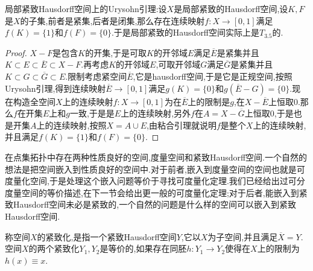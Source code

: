 局部紧致Hausdorff空间上的Urysohn引理:设$X$是局部紧致的Hausdorff空间,设$K,F$是$X$的子集,前者是紧集,后者是闭集,那么存在连续映射$f:X\to[0,1]$满足$f(K)=\{1\}$和$f(F)=\{0\}$.于是局部紧致的Hausdorff空间实际上是$T_{3.5}$的.
\begin{proof}
	
	$X-F$是包含$K$的开集,于是可取$K$的开邻域$E$满足$\overline{E}$是紧集并且$K\subset E\subset\overline{E}\subset X-F$.再考虑$K$的开邻域$E$,可取开邻域$G$满足$\overline{G}$是紧集并且$K\subset G\subset\overline{G}\subset E$.限制考虑紧空间$\overline{E}$,它是hausdorff空间,于是它是正规空间,按照Urysohn引理,得到连续映射$\overline{E}\to[0,1]$满足$g(K)=\{0\}$和$g(\overline{E}-G)=\{0\}$.现在构造全空间$X$上的连续映射$f:X\to[0,1]$为在$\overline{E}$上的限制是$g$,在$X-\overline{E}$上恒取0.那么$f$在开集$E$上和$g$一致,于是是$E$上的连续映射,另外$f$在$A=X-\overline{G}$上恒取0,于是也是开集$A$上的连续映射,按照$X=A\cup E$,由粘合引理就说明$f$是整个$X$上的连续映射,并且满足$f(K)=\{1\}$和$f(F)=\{0\}$.
\end{proof}

在点集拓扑中存在两种性质良好的空间,度量空间和紧致Hausdorff空间.一个自然的想法是把空间嵌入到性质良好的空间中.对于前者,嵌入到度量空间的空间也就是可度量化空间,于是处理这个嵌入问题等价于寻找可度量化定理.我们已经给出过可分度量空间的等价描述,在下一节会给出更一般的可度量化定理;对于后者,能嵌入到紧致Hausdorff空间未必是紧致的,一个自然的问题是什么样的空间可以嵌入到紧致Hausdorff空间.

称空间$X$的紧致化,是指一个紧致Hausdorff空间$Y$,它以$X$为子空间,并且满足$\overline{X}=Y$.空间$X$的两个紧致化$Y_1,Y_2$是等价的,如果存在同胚$h:Y_1\to Y_2$使得在$X$上的限制为$h(x)\equiv x$.

